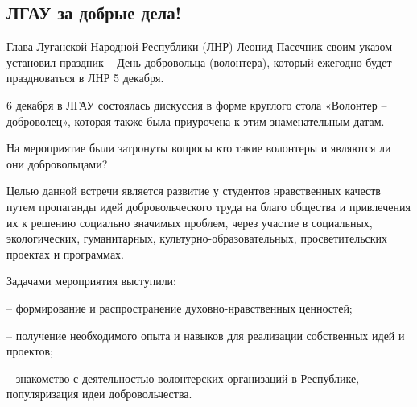  
 
 
 
 
\subsection{ЛГАУ за добрые дела!}
\label{sec:06_12_2021.stz.edu.lnr.lgau.1.za_dobryje_dela}




Глава Луганской Народной Республики (ЛНР) Леонид Пасечник своим указом
установил праздник – День добровольца (волонтера), который ежегодно будет
праздноваться в ЛНР 5 декабря.

6 декабря в ЛГАУ состоялась дискуссия в форме круглого стола «Волонтер –
доброволец», которая также была приурочена к этим знаменательным датам.

На мероприятие были затронуты вопросы кто такие волонтеры и являются ли они
добровольцами?

Целью данной встречи является развитие у студентов нравственных качеств путем
пропаганды идей добровольческого труда на благо общества и привлечения их к
решению социально значимых проблем, через участие в социальных, экологических,
гуманитарных, культурно-образовательных, просветительских проектах и
программах.


Задачами мероприятия выступили:

– формирование и распространение духовно-нравственных ценностей;

– получение необходимого опыта и навыков для реализации собственных идей и проектов;

– знакомство с деятельностью волонтерских организаций в Республике, популяризация идеи добровольчества.

